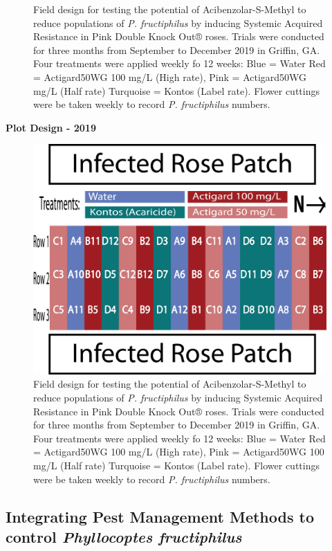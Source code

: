 \documentclass[12pt,final,CPage]{ufthesis}
\begin{document}
{\begin{figure}
{  }

  \caption{Field design for testing the potential of Acibenzolar-S-Methyl to reduce populations of \textit{P. fructiphilus} by inducing Systemic Acquired Resistance in Pink Double Knock Out® roses. Trials were conducted for three months from September to December 2019 in Griffin, GA. Four treatments were applied weekly fo 12 weeks: Blue = Water Red = Actigard50WG 100 \si{\milli\gram}/L (High rate),  Pink = Actigard50WG \si{\milli\gram}/L (Half rate) Turquoise = Kontos (Label rate). Flower cuttings were be taken weekly to record \textit{P. fructiphilus} numbers.}\label{fig:unnamed-chunk-1}
  \end{figure}
  \textbf{Plot Design - 2019}
  \begin{figure}

  {\centering \includegraphics[width=0.8\linewidth]{figure/rrv_asm_plot_2019_griffin} 

  }

  \caption{Field design for testing the potential of Acibenzolar-S-Methyl to reduce populations of \textit{P. fructiphilus} by inducing Systemic Acquired Resistance in Pink Double Knock Out® roses. Trials were conducted for three months from September to December 2019 in Griffin, GA. Four treatments were applied weekly fo 12 weeks: Blue = Water Red = Actigard50WG 100 \si{\milli\gram}/L (High rate),  Pink = Actigard50WG 100 \si{\milli\gram}/L (Half rate) Turquoise = Kontos (Label rate). Flower cuttings were be taken weekly to record \textit{P. fructiphilus} numbers.}\label{fig:unnamed-chunk-2}
  \end{figure}
  \hypertarget{ipm-trials}{%
  \subsection{\texorpdfstring{Integrating Pest Management Methods to control \emph{Phyllocoptes fructiphilus}}{Integrating Pest Management Methods to control Phyllocoptes fructiphilus}}\label{ipm-trials}}

}
\end{document}

